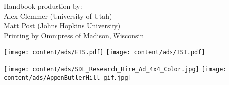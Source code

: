 \documentclass[twoside,makeidx]{book}
\begin{document}
\fancyfoot[C]{}


\fancyfoot[C]{\thepage}

\thispagestyle{empty}
\mbox{}

\vfill
\noindent Handbook production by: \\ 
\indent Alex Clemmer (University of Utah) \\
\indent Matt Post (Johns Hopkins University) \\  
Printing by Omnipress of Madison, Wisconsin
\newpage

\frontmatter

\clearpage

\clearpage

\clearpage%
\setheaders{}{}

\clearpage
%
\clearpage%
\setheaders{}{}

\setcounter{tocdepth}{2}
\tableofcontents
\mainmatter
\pagestyle{fancy}

%
\clearpage




% 
%
% 
%  
%  
%  



\cleardoublepage
{}
\printindex

\cleardoublepage
{}
\begin{center}
  \texttt{[image: content/ads/ETS.pdf]}
  \vfill
  \texttt{[image: content/ads/ISI.pdf]}
\end{center}

\newpage
\begin{center}
  \texttt{[image: content/ads/SDL\_Research\_Hire\_Ad\_4x4\_Color.jpg]}
  \vfill
  \texttt{[image: content/ads/AppenButlerHill-gif.jpg]}
\end{center}

\clearpage
{}


\clearpage
{}


\cleardoublepage



\end{document}
